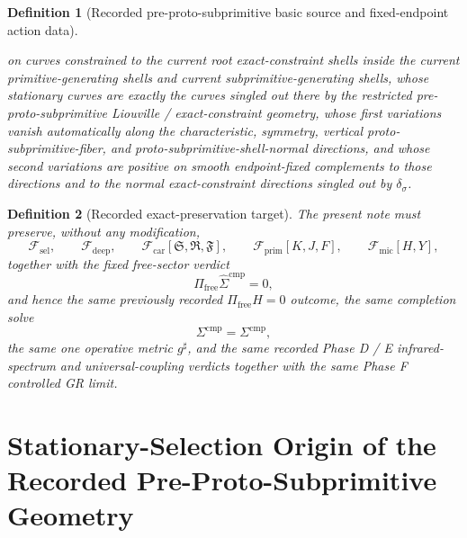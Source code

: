 \documentclass[11pt]{article}
\newcommand{\CompletedMetric}{g^{\sharp}}
\newcommand{\CompShift}{\Sigma^{\mathrm{cmp}}}
\newcommand{\CompLift}{\widehat\Sigma^{\mathrm{cmp}}}
\newcommand{\FreeProj}{\Pi_{\mathrm{free}}}
\newcommand{\GaugeAux}{Y}
\newcommand{\MicFunctional}{\mathscr F_{\mathrm{mic}}}
\newcommand{\PrimFunctional}{\mathscr F_{\mathrm{prim}}}
\newcommand{\CarrierFunctional}{\mathscr F_{\mathrm{car}}}
\newcommand{\DeepFunctional}{\mathscr F_{\mathrm{deep}}}
\newcommand{\StemFunctional}{\mathscr F_{\mathrm{sel}}}
\newcommand{\PrimStrain}{K}
\newcommand{\PrimNeutral}{J}
\newcommand{\PrimFree}{F}
\newcommand{\CarrierSeed}{\mathfrak S}
\newcommand{\RelabelSeed}{\mathfrak R}
\newcommand{\FreeSeed}{\mathfrak F}
\newcommand{\ConstraintGap}[1]{\delta_{#1}}
\newtheorem{definition}{Definition}
\begin{document}
\begin{definition}[Recorded pre-proto-subprimitive basic source and fixed-endpoint action data]
\begin{enumerate}
\[    \]
    on curves constrained to the current root exact-constraint shells inside the current primitive-generating shells and current subprimitive-generating shells, whose stationary curves are exactly the curves singled out there by the restricted pre-proto-subprimitive Liouville / exact-constraint geometry, whose first variations vanish automatically along the characteristic, symmetry, vertical proto-subprimitive-fiber, and proto-subprimitive-shell-normal directions, and whose second variations are positive on smooth endpoint-fixed complements to those directions and to the normal exact-constraint directions singled out by \(\ConstraintGap{\sigma}\).
\end{enumerate}
\end{definition}

\begin{definition}[Recorded exact-preservation target]
\label{def:recorded_target}
The present note must preserve, without any modification,
\begin{equation}
\StemFunctional,
\qquad
\DeepFunctional,
\qquad
\CarrierFunctional[\CarrierSeed,\RelabelSeed,\FreeSeed],
\qquad
\PrimFunctional[\PrimStrain,\PrimNeutral,\PrimFree],
\qquad
\MicFunctional[H,\GaugeAux],
\label{eq:target_functionals}
\end{equation}
together with the fixed free-sector verdict
\begin{equation}
\FreeProj\CompLift=0,
\label{eq:target_free}
\end{equation}
and hence the same previously recorded \(\Pi_{\mathrm{free}}H=0\) outcome, the same completion solve
\begin{equation}
\CompShift=\Sigma^{\mathrm{cmp}},
\label{eq:target_sigma}
\end{equation}
the same one operative metric \(\CompletedMetric\), and the same recorded Phase D / E infrared-spectrum and universal-coupling verdicts together with the same Phase F controlled GR limit.
\end{definition}

\section{Stationary-Selection Origin of the Recorded Pre-Proto-Subprimitive Geometry}
\end{document}
